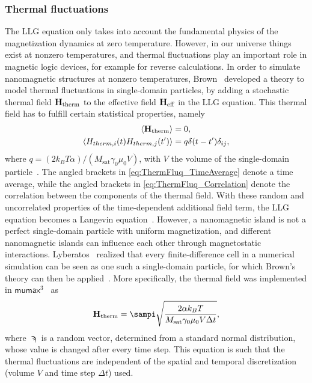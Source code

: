 \documentclass[11pt,a4paper,english,twoside]{article}
\newcommand{\mumax}{$\mathsf{mumax}^3$}
\begin{document}
\subsubsection{Thermal fluctuations}
The LLG equation only takes into account the fundamental physics of the magnetization dynamics at zero temperature. However, in our universe things exist at nonzero temperatures, and thermal fluctuations play an important role in magnetic logic devices, for example for reverse calculations. In order to simulate nanomagnetic structures at nonzero temperatures, Brown~\cite{ThermFluc_SingleDomain} developed a theory to model thermal fluctuations in single-domain particles, by adding a stochastic thermal field $\vb{H_\mathrm{therm}}$ to the effective field $\vb{H_\mathrm{eff}}$ in the LLG equation. This thermal field has to fulfill certain statistical properties, namely
\begin{align}
    \langle \vb{H_\mathrm{therm}} \rangle &= 0 \mathrm{,} \label{eq:ThermFluq_TimeAverage} \\
    \langle H_{therm,i}(t) H_{therm,j}(t') \rangle &= q \delta(t-t') \delta_{ij} \mathrm{,} \label{eq:ThermFluq_Correlation}
\end{align}
where $q=(2 k_B T \alpha)/(M_\mathrm{sat} \gamma_0 \mu_0 V)$, with $V$ the volume of the single-domain particle~\cite{phd_leliaert}. The angled brackets in \eqref{eq:ThermFluq_TimeAverage} denote a time average, while the angled brackets in \eqref{eq:ThermFluq_Correlation} denote the correlation between the components of the thermal field. With these random and uncorrelated properties of the time-dependent additional field term, the LLG equation becomes a Langevin equation~\cite{ThermFluc_SingleDomain}. However, a nanomagnetic island is not a perfect single-domain particle with uniform magnetization, and different nanomagnetic islands can influence each other through magnetostatic interactions.
Lyberatos~\cite{Lyberatos_1993} realized that every finite-difference cell in a numerical simulation can be seen as one such a single-domain particle, for which Brown's theory can then be applied~\cite{phd_leliaert}. More specifically, the thermal field was implemented in \mumax{}~\cite{MuMax3,LEL-17b} as
\begin{equation}
    \vb{H_\mathrm{therm}} = \sampi \sqrt{\frac{2 \alpha k_B T}{M_\mathrm{sat} \gamma_0 \mu_0 V \Delta t}} \mathrm{,}
    \label{eq:H_therm}
\end{equation}
where $\sampi$ is a random vector, determined from a standard normal distribution, whose value is changed after every time step. This equation is such that the thermal fluctuations are independent of the spatial and temporal discretization (volume $V$ and time step $\Delta t$) used.
\end{document}
